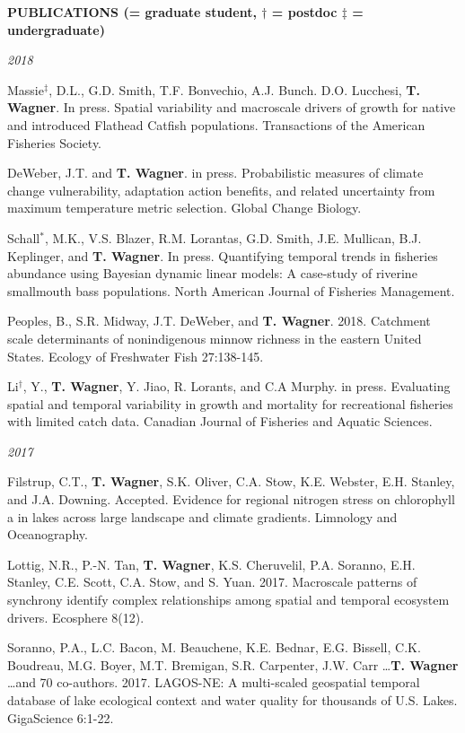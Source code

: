 \documentclass[10pt]{article}
\begin{document}
\begin{flushleft}
\vspace{8pt}
\centerline {\bf{PUBLICATIONS ({\small * = graduate student, $\dagger$ = postdoc $\ddagger$ = undergraduate})}}
\vspace{5pt}
\emph{2018}
\begin{etaremune}[start=75]
\item Massie$^\ddagger$, D.L., G.D. Smith, T.F. Bonvechio, A.J. Bunch. D.O. Lucchesi, {\bf T. Wagner}. In press. Spatial variability and macroscale drivers of growth for native and introduced Flathead Catfish populations. Transactions of the American Fisheries Society.
\item DeWeber, J.T. and {\bf T. Wagner}. in press. Probabilistic measures of climate change vulnerability, adaptation action benefits, and related uncertainty from maximum temperature metric selection. Global Change Biology.
\item Schall$^*$, M.K., V.S. Blazer, R.M. Lorantas, G.D. Smith, J.E. Mullican, B.J. Keplinger, and {\bf T. Wagner}. In press. Quantifying temporal trends in fisheries abundance using Bayesian dynamic linear models: A case-study of riverine smallmouth bass populations. North American Journal of Fisheries Management.
\item Peoples, B., S.R. Midway, J.T. DeWeber, and {\bf T. Wagner}. 2018. Catchment scale determinants of nonindigenous minnow richness in the eastern United States. Ecology of Freshwater Fish 27:138-145.
\item Li$^\dagger$, Y., {\bf T. Wagner}, Y. Jiao, R. Lorants, and C.A Murphy. in press. Evaluating spatial and temporal variability in growth and mortality for recreational fisheries with limited catch data. Canadian Journal of Fisheries and Aquatic Sciences.
\end{etaremune}
\emph{2017}
\begin{etaremune}[start=70]
\item Filstrup, C.T., {\bf T. Wagner}, S.K. Oliver, C.A. Stow, K.E. Webster, E.H. Stanley, and J.A. Downing. Accepted. Evidence for regional nitrogen stress on chlorophyll a in lakes across large landscape and climate gradients. Limnology and Oceanography.

\item Lottig, N.R., P.-N. Tan, {\bf T. Wagner}, K.S. Cheruvelil, P.A. Soranno, E.H. Stanley, C.E. Scott, C.A. Stow, and S. Yuan. 2017. Macroscale patterns of synchrony identify complex relationships among spatial and temporal ecosystem drivers. Ecosphere 8(12).

\item Soranno, P.A., L.C. Bacon, M. Beauchene, K.E. Bednar, E.G. Bissell, C.K. Boudreau, M.G. Boyer, M.T. Bremigan, S.R. Carpenter, J.W. Carr \ldots  {\bf T. Wagner} \ldots  and 70 co-authors. 2017. LAGOS-NE: A multi-scaled geospatial temporal database of lake ecological context and water quality for thousands of U.S. Lakes. GigaScience 6:1-22.


\end{etaremune}
\end{flushleft}
\end{document}
